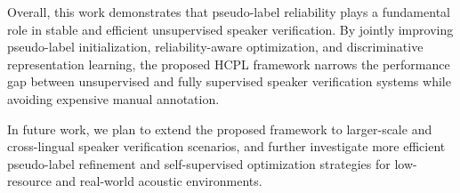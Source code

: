 \documentclass[lettersize,journal]{IEEEtran}
\begin{document}
Overall, this work demonstrates that pseudo-label reliability plays a fundamental role in stable and efficient unsupervised speaker verification. By jointly improving pseudo-label initialization, reliability-aware optimization, and discriminative representation learning, the proposed HCPL framework narrows the performance gap between unsupervised and fully supervised speaker verification systems while avoiding expensive manual annotation.

In future work, we plan to extend the proposed framework to larger-scale and cross-lingual speaker verification scenarios, and further investigate more efficient pseudo-label refinement and self-supervised optimization strategies for low-resource and real-world acoustic environments.


% 
\nocite{*}







 







\vfill
\end{document}
